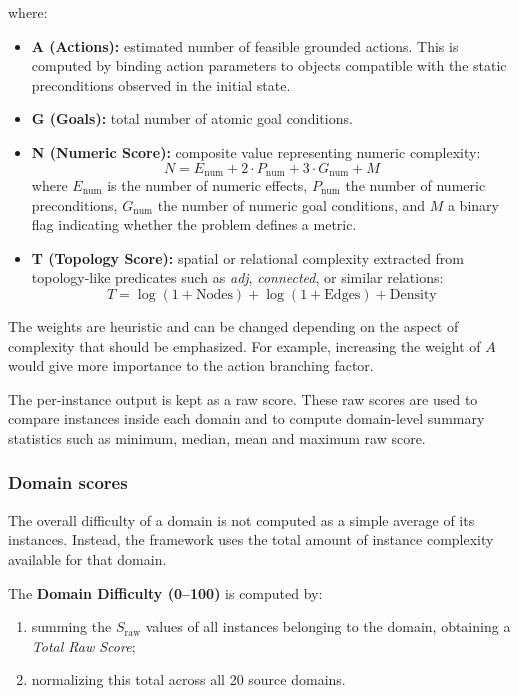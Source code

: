 where:
\begin{itemize}
    \item \textbf{A (Actions):} estimated number of feasible grounded actions. This is computed by binding action parameters to objects compatible with the static preconditions observed in the initial state.
    \item \textbf{G (Goals):} total number of atomic goal conditions.
    \item \textbf{N (Numeric Score):} composite value representing numeric complexity:
    \begin{equation}
        N = E_{\mathrm{num}} + 2 \cdot P_{\mathrm{num}} + 3 \cdot G_{\mathrm{num}} + M
    \end{equation}
    where $E_{\mathrm{num}}$ is the number of numeric effects, $P_{\mathrm{num}}$ the number of numeric preconditions, $G_{\mathrm{num}}$ the number of numeric goal conditions, and $M$ a binary flag indicating whether the problem defines a metric.
    \item \textbf{T (Topology Score):} spatial or relational complexity extracted from topology-like predicates such as \textit{adj}, \textit{connected}, or similar relations:
    \begin{equation}
        T = \log(1 + \mathrm{Nodes}) + \log(1 + \mathrm{Edges}) + \mathrm{Density}
    \end{equation}
\end{itemize}

The weights are heuristic and can be changed depending on the aspect of complexity that should be emphasized. For example, increasing the weight of $A$ would give more importance to the action branching factor.

The per-instance output is kept as a raw score. These raw scores are used to compare instances inside each domain and to compute domain-level summary statistics such as minimum, median, mean and maximum raw score.

\subsubsection{Domain scores}

The overall difficulty of a domain is not computed as a simple average of its instances. Instead, the framework uses the total amount of instance complexity available for that domain.

The \textbf{Domain Difficulty (0--100)} is computed by:
\begin{enumerate}
    \item summing the $S_{\mathrm{raw}}$ values of all instances belonging to the domain, obtaining a \textit{Total Raw Score};
    \item normalizing this total across all 20 source domains.
\end{enumerate}

